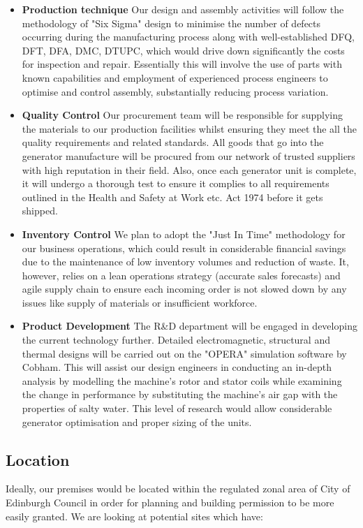 \documentclass[a4paper,11pt]{article}
\begin{document}
\begin{itemize}
	\item \textbf{Production technique} Our design and assembly activities will follow the methodology of "Six Sigma" design\cite{d1} to minimise the number of defects occurring during the manufacturing process along with well-established DFQ, DFT, DFA, DMC, DTUPC\cite{d15}, which would drive down significantly the costs for inspection and repair. Essentially this will involve the use of parts with known capabilities and employment of experienced process engineers to optimise and control assembly, substantially reducing process variation.
	
	\item \textbf{Quality Control} Our procurement team will be responsible for supplying the materials to our production facilities whilst ensuring they meet the all the quality requirements and related standards. All goods that go into the generator manufacture will be procured from our network of trusted suppliers with high reputation in their field. Also, once each generator unit is complete, it will undergo a thorough test to ensure it complies to all requirements outlined in the Health and Safety at Work etc. Act 1974 before it gets shipped.
	
	\item \textbf{Inventory Control} We plan to adopt the "Just In Time" methodology for our business operations, which could result in considerable financial savings due to the maintenance of low inventory volumes and reduction of waste. It, however, relies on a lean operations strategy (accurate sales forecasts) and agile supply chain to ensure each incoming order is not slowed down by any issues like supply of materials or insufficient workforce\cite{d2}.
	
	\item \textbf{Product Development} The R\&D department will be engaged in developing the current technology further. Detailed electromagnetic, structural and thermal designs will be carried out on the "OPERA" simulation software by Cobham\cite{d3}. This will assist our design engineers in conducting an in-depth analysis by modelling the machine's rotor and stator coils while examining the change in performance by substituting the machine's air gap with the properties of salty water. This level of research would allow considerable generator optimisation and proper sizing of the units. 
\end{itemize}

\subsection{Location}
Ideally, our premises would be located within the regulated zonal area of City of Edinburgh Council in order for planning and building permission to be more easily granted. We are looking at potential sites which have:
\end{document}
